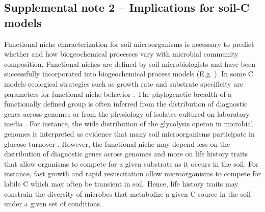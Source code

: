 \documentclass{article}
\begin{document}
\subsection{Supplemental note 2 -- Implications for soil-C models}
Functional niche characterization for soil microorganisms is necessary to
predict whether and how biogeochemical processes vary with microbial community
composition. Functional niches are defined by soil microbiologists and have
been successfully incorporated into biogeochemical process models (E.g.
\citep{wieder_2014a,Kaiser2014a}). In some C models ecological strategies such
as growth rate and substrate specificity are parameters for functional niche
behavior \citep{Kaiser2014a}. The phylogenetic breadth of a functionally
defined group is often inferred from the distribution of diagnostic genes
across genomes \citep{Berlemont2013} or from the physiology of isolates
cultured on laboratory media \citep{Martiny2013}. For instance, the wide
distribution of the glycolysis operon in microbial genomes is interpreted
as evidence that many soil microorganisms participate in glucose turnover
\citep{McGuire2010}. However, the functional niche may depend less on the
distribution of diagnostic genes across genomes and more on life history
traits that allow organisms to compete for a given substrate as it occurs
in the soil. For instance, fast growth and rapid resuscitation allow
microorganisms to compete for labile C which may often be transient in
soil. Hence, life history traits may constrain the diversity of microbes
that metabolize a given C source in the soil under a given set of
conditions.
\end{document}
